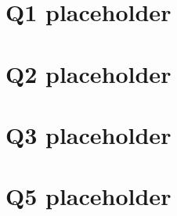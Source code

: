 \documentclass[11pt]{article}
\begin{document}
\section{Q1 placeholder}\label{p1:sec:a}
\section{Q2 placeholder}\label{p9:sec:b}
\section{Q3 placeholder}\label{p9:sec:c}

\section{Q5 placeholder}\label{p9:sec:e}
\end{document}
